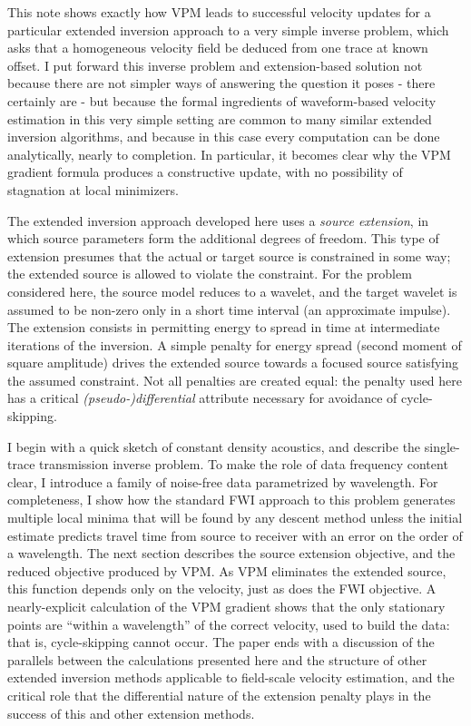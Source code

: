 This note shows exactly how VPM leads to successful velocity updates
for a particular extended inversion approach to a very simple inverse
problem, which asks that a homogeneous velocity field be deduced from
one trace at known offset. I put forward this inverse problem and
extension-based solution not because there are not simpler
ways of answering the question it poses - there certainly are - but
because the formal ingredients of waveform-based velocity estimation
in this very simple setting are common to many similar extended
inversion algorithms, and because in this case every computation can
be done analytically, nearly to completion. In particular, it becomes
clear why the VPM gradient formula produces a constructive update,
with no possibility of stagnation at local minimizers.

The extended inversion approach
developed here uses a {\em source extension}, in which source
parameters form the additional degrees of freedom. This type of
extension presumes that the actual or target source is constrained in
some way; the extended source is allowed to violate the
constraint. For the problem considered here, the source model reduces
to a wavelet, and the target wavelet is assumed to be non-zero only in
a short time
interval (an approximate impulse). The extension consists in permitting energy to spread
in time at intermediate iterations of the inversion. A simple penalty
for energy spread (second moment of square amplitude) drives the
extended source towards a focused source satisfying the assumed
constraint. Not all penalties are created equal: the penalty used here
has a critical {\em (pseudo-)differential} attribute necessary for avoidance of cycle-skipping.


I begin with a quick sketch of constant density acoustics,
and describe the single-trace transmission inverse problem. To make
the role of data frequency content clear, I introduce a family of
noise-free data parametrized by wavelength. For completeness, I show how
the standard FWI approach to this problem generates multiple local
minima that will be found by any descent method unless the initial
estimate predicts travel time from source to receiver with an error
on the order of a wavelength. The next section describes the source
extension objective, and the reduced objective
produced by VPM. As VPM eliminates the extended source, this
function depends only on the velocity, just as does the FWI objective.  A
nearly-explicit calculation of the VPM gradient 
shows that the only stationary points are ``within a wavelength'' of
the correct velocity, used to build the data: that is, cycle-skipping
cannot occur. The paper ends with a discussion of the parallels
between the calculations presented here and the structure of other
extended inversion methods applicable to field-scale velocity
estimation, and the critical role that the differential nature of the
extension penalty plays in the success of this and other extension methods.

